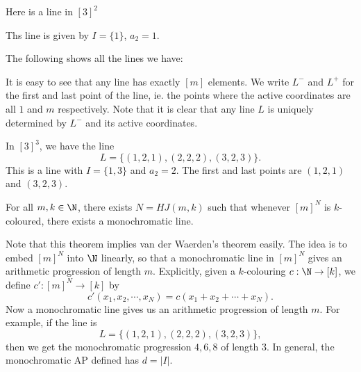 \documentclass[a4paper]{article}
\begin{document}
\begin{eg}
  Here is a line in $[3]^2$
  \begin{center}
  \end{center}
  Ths line is given by $I = \{1\}$, $a_2 = 1$.

  The following shows all the lines we have:
  \begin{center}
  \end{center}
\end{eg}
It is easy to see that any line has exactly $[m]$ elements. We write $L^-$ and $L^+$ for the first and last point of the line, ie. the points where the active coordinates are all $1$ and $m$ respectively. Note that it is clear that any line $L$ is uniquely determined by $L^-$ and its active coordinates.

\begin{eg}
  In $[3]^3$, we have the line
  \[
    L = \{(1, 2, 1), (2, 2, 2), (3, 2, 3)\}.
  \]
  This is a line with $I = \{1, 3\}$ and $a_2 = 2$. The first and last points are $(1, 2, 1)$ and $(3, 2, 3)$.
\end{eg}

\begin{thm}
  For all $m, k \in \N$, there exists $N = HJ(m, k)$ such that whenever $[m]^N$ is $k$-coloured, there exists a monochromatic line.
\end{thm}
Note that this theorem implies van der Waerden's theorem easily. The idea is to embed $[m]^N$ into $\N$ linearly, so that a monochromatic line in $[m]^N$ gives an arithmetic progression of length $m$. Explicitly, given a $k$-colouring $c: \N \to [k]$, we define $c': [m]^N \to [k]$ by
\[
  c'(x_1, x_2, \cdots, x_N) = c(x_1 + x_2 + \cdots + x_N).
\]
Now a monochromatic line gives us an arithmetic progression of length $m$. For example, if the line is
\[
  L = \{(1, 2, 1), (2, 2, 2), (3, 2, 3)\},
\]
then we get the monochromatic progression $4, 6, 8$ of length $3$. In general, the monochromatic AP defined has $d = |I|$.
\end{document}
